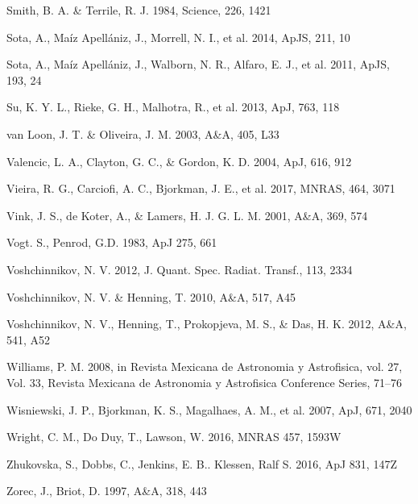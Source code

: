 \documentclass[tradiabstract]{aa} %
\begin{document}
\begin{thebibliography}{}
\item[] Smith, B. A. \& Terrile, R. J. 1984, Science, 226, 1421


        
\item[] Sota, A., Maíz Apellániz, J., Morrell, N. I., et al. 2014, ApJS, 211, 10

\item[] Sota, A., Maíz Apellániz, J., Walborn, N. R., Alfaro, E. J., et al. 2011, ApJS, 193, 24


\item[] Su, K. Y. L., Rieke, G. H., Malhotra, R., et al. 2013, ApJ, 763, 118

\item[] van Loon, J. T. \& Oliveira, J. M. 2003, A\&A, 405, L33


\item[]  Valencic, L. A., Clayton, G. C., \& Gordon, K. D. 2004, ApJ, 616, 912
  
\item[] Vieira, R. G., Carciofi, A. C., Bjorkman, J. E., et al. 2017, MNRAS, 464, 3071

\item[] Vink, J. S., de Koter, A., \& Lamers, H. J. G. L. M. 2001, A\&A, 369, 574
\item[] Vogt. S., Penrod, G.D. 1983, ApJ 275, 661

\item[] Voshchinnikov, N. V. 2012, J. Quant. Spec. Radiat. Transf., 113, 2334

\item[] Voshchinnikov, N. V. \& Henning, T. 2010, A\&A, 517, A45

\item[] Voshchinnikov, N. V., Henning, T., Prokopjeva, M. S., \& Das, H. K.
2012, A\&A, 541, A52


\item[] Williams, P. M. 2008, in Revista Mexicana de Astronomia y
Astrofisica, vol. 27, Vol. 33, Revista Mexicana de Astronomia y
Astrofisica Conference Series, 71–76

\item[] Wisniewski, J. P., Bjorkman, K. S., Magalhaes, A. M., et al. 2007, ApJ, 671, 2040

\item[]  Wright, C. M., Do Duy, T.,  Lawson, W. 2016, MNRAS 457, 1593W

\item[] Zhukovska, S., Dobbs, C., Jenkins, E. B.. Klessen, Ralf S. 2016, ApJ 831, 147Z

\item[] Zorec, J., Briot, D. 1997, A\&A, 318, 443

\end{thebibliography}
\end{document}
